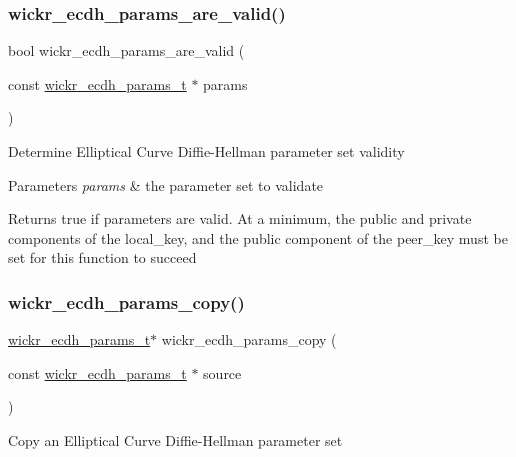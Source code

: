 \subsubsection{\texorpdfstring{wickr\+\_\+ecdh\+\_\+params\+\_\+are\+\_\+valid()}{wickr\_ecdh\_params\_are\_valid()}}
{\footnotesize\ttfamily bool wickr\+\_\+ecdh\+\_\+params\+\_\+are\+\_\+valid (\begin{DoxyParamCaption}\item[{const \hyperlink{structwickr__ecdh__params}{wickr\+\_\+ecdh\+\_\+params\+\_\+t} $\ast$}]{params }\end{DoxyParamCaption})}

Determine Elliptical Curve Diffie-\/\+Hellman parameter set validity


\begin{DoxyParams}{Parameters}
{\em params} & the parameter set to validate \\
\hline
\end{DoxyParams}
\begin{DoxyReturn}{Returns}
true if parameters are valid. At a minimum, the public and private components of the \textquotesingle{}local\+\_\+key\textquotesingle{}, and the public component of the \textquotesingle{}peer\+\_\+key\textquotesingle{} must be set for this function to succeed 
\end{DoxyReturn}
\mbox{\label{group__wickr__ecdh__params_ga016f2b643f2636c05ed72bc08a0314f0}} 
\subsubsection{\texorpdfstring{wickr\+\_\+ecdh\+\_\+params\+\_\+copy()}{wickr\_ecdh\_params\_copy()}}
{\footnotesize\ttfamily \hyperlink{structwickr__ecdh__params}{wickr\+\_\+ecdh\+\_\+params\+\_\+t}$\ast$ wickr\+\_\+ecdh\+\_\+params\+\_\+copy (\begin{DoxyParamCaption}\item[{const \hyperlink{structwickr__ecdh__params}{wickr\+\_\+ecdh\+\_\+params\+\_\+t} $\ast$}]{source }\end{DoxyParamCaption})}

Copy an Elliptical Curve Diffie-\/\+Hellman parameter set


